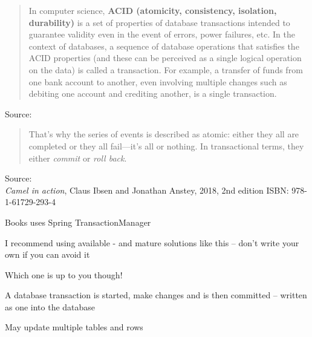 \documentclass[Screen16to9,17pt]{foils}
\begin{document}

\begin{quote}
In computer science, {\bf ACID (atomicity, consistency, isolation, durability)} is a set of properties of database transactions intended to guarantee validity even in the event of errors, power failures, etc. In the context of databases, a sequence of database operations that satisfies the ACID properties (and these can be perceived as a single logical operation on the data) is called a transaction. For example, a transfer of funds from one bank account to another, even involving multiple changes such as debiting one account and crediting another, is a single transaction.
\end{quote}

Source: {\footnotesize\\
}



\begin{quote}
  That’s why the series of events is described as atomic:
  either they all are completed or they all fail—it’s all or nothing. In transactional terms,
  they either \emph{commit} or \emph{roll back}.

\end{quote}
Source: {\footnotesize\\
\emph{Camel in action}, Claus Ibsen and Jonathan Anstey, 2018, 2nd edition
ISBN: 978-1-61729-293-4}

\begin{list2}
\item Books uses Spring TransactionManager
\item I recommend using available - and mature solutions like this -- don't write your own if you can avoid it
\item Which one is up to you though!
\end{list2}



\begin{list2}
\item A database transaction is started, make changes and is then committed -- written as one into the database
\item May update multiple tables and rows
\end{list2}


\end{document}
